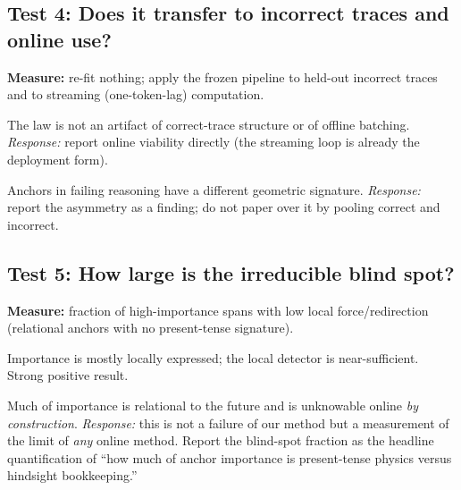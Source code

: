 \documentclass[11pt]{article}
\begin{document}
\subsection{Test 4: Does it transfer to incorrect traces and online use?}
\textbf{Measure:} re-fit nothing; apply the frozen pipeline to held-out incorrect traces and to streaming (one-token-lag) computation.
\begin{description}[leftmargin=1.5em]
  \item[Transfers.] The law is not an artifact of correct-trace structure or of offline batching. \emph{Response:} report online viability directly (the streaming loop is already the deployment form).
  \item[Fails on incorrect traces.] Anchors in failing reasoning have a different geometric signature. \emph{Response:} report the asymmetry as a finding; do not paper over it by pooling correct and incorrect.
\end{description}

\subsection{Test 5: How large is the irreducible blind spot?}
\label{sec:blindspot}
\textbf{Measure:} fraction of high-importance spans with low local force/redirection (relational anchors with no present-tense signature).
\begin{description}[leftmargin=1.5em]
  \item[Small blind spot.] Importance is mostly locally expressed; the local detector is near-sufficient. Strong positive result.
  \item[Large blind spot.] Much of importance is relational to the future and is unknowable online \emph{by construction}. \emph{Response:} this is not a failure of our method but a measurement of the limit of \emph{any} online method. Report the blind-spot fraction as the headline quantification of ``how much of anchor importance is present-tense physics versus hindsight bookkeeping.''
\end{description}
\end{document}
